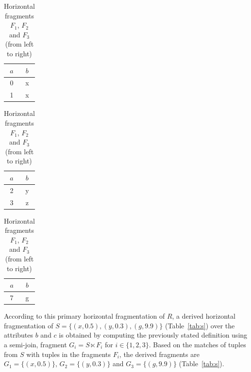 \begin{exmp}
\begin{table}[h]
    \hspace*{\fill}
    \begin{tabular}{|c|c|}
        \hline
        $a$ & $b$\\
        \hline
        0 & x \\
        1 & x \\
        \hline
    \end{tabular}
    \hfill
    \begin{tabular}{|c|c|}
        \hline
        $a$ & $b$\\
        \hline
        2 & y \\
        3 & z \\
        \hline
    \end{tabular}
    \hfill
    \begin{tabular}{|c|c|}
        \hline
        $a$ & $b$\\
        \hline
        7 & g \\
        \hline
    \end{tabular}
    \hspace*{\fill}
    \caption{Horizontal fragments $F_1$, $F_2$ and $F_3$ (from left to right)}
    \label{tab:r_frag}
\end{table}

According to this primary horizontal fragmentation of $R$, a derived horizontal fragmentation of $S=\{(x, 0.5), (y, 0.3), (g, 9.9)\}$ (Table~\ref{tab:s})
over the attributes $b$ and $c$ is obtained by computing the previously stated definition using a semi-join, fragment $G_i = S \ltimes F_i$ for
$i\in\{1,2,3\}$. Based on the matches of tuples from $S$ with tuples in the fragments $F_i$, the derived fragments are 
$G_1=\{(x,0.5)\}$, $G_2=\{(y, 0.3)\}$ and $G_3=\{(g, 9.9)\}$ (Table~\ref{tab:s}).



\end{exmp}
